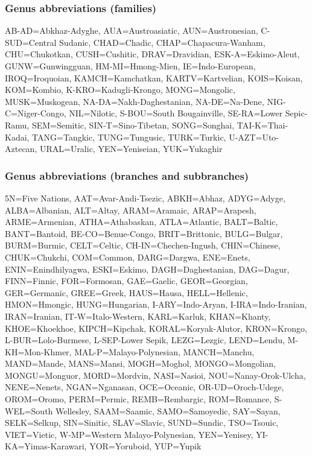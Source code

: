 
\subsubsection{Genus abbreviations (families)}
\begin{flushleft}
AB-AD=Abkhaz-Adyghe, AUA=Austroasiatic, AUN=Austronesian, C-SUD=Central Sudanic, CHAD=Chadic, CHAP=Chapacura-Wanham, CHU=Chukotkan, CUSH=Cushitic, DRAV=Dravidian, ESK-A=Eskimo-Aleut, GUNW=Gunwingguan, HM-MI=Hmong-Mien, IE=Indo-European, IROQ=Iroquoian, KAMCH=Kamchatkan, KARTV=Kartvelian, KOIS=Koisan, KOM=Kombio, K-KRO=Kadugli-Krongo, MONG=Mongolic, MUSK=Muskogean, NA-DA=Nakh-Daghestanian, NA-DE=Na-Dene, NIG-C=Niger-Congo, NIL=Nilotic, S-BOU=South Bougainville, SE-RA=Lower Sepic-Ramu, SEM=Semitic, SIN-T=Sino-Tibetan, SONG=Songhai, TAI-K=Thai-Kadai, TANG=Tangkic, TUNG=Tungusic, TURK=Turkic, U-AZT=Uto-Aztecan, URAL=Uralic, YEN=Yeniseian, YUK=Yukaghir
\end{flushleft}

\subsubsection{Genus abbreviations (branches and subbranches)}
\begin{flushleft}
5N=Five Nations, AAT=Avar-Andi-Tsezic, ABKH=Abhaz, ADYG=Adyge, ALBA=Albanian, ALT=Altay, ARAM=Aramaic, ARAP=Arapesh, ARME=Armenian, ATHA=Athabaskan, ATLA=Atlantic, BALT=Baltic, BANT=Bantoid, BE-CO=Benue-Congo, BRIT=Brittonic, BULG=Bulgar, BURM=Burmic, CELT=Celtic, CH-IN=Chechen-Ingush, CHIN=Chinese, CHUK=Chukchi, COM=Common, DARG=Dargwa, ENE=Enets, ENIN=Enindhilyagwa, ESKI=Eskimo, DAGH=Daghestanian, DAG=Dagur, FINN=Finnic, FOR=Formosan, GAE=Gaelic, GEOR=Georgian, GER=Germanic, GREE=Greek, HAUS=Hausa, HELL=Hellenic, HMON=Hmongic, HUNG=Hungarian, I-ARY=Indo-Aryan, I-IRA=Indo-Iranian, IRAN=Iranian, IT-W=Italo-Western, KARL=Karluk, KHAN=Khanty, KHOE=Khoekhoe, KIPCH=Kipchak, KORAL=Koryak-Alutor, KRON=Krongo, L-BUR=Lolo-Burmese, L-SEP-Lower Sepik, LEZG=Lezgic, LEND=Lendu, M-KH=Mon-Khmer, MAL-P=Malayo-Polynesian, MANCH=Manchu, MAND=Mande, MANS=Mansi, MOGH=Moghol, MONGO=Mongolian, MONGU=Monguor, MORD=Mordvin, NASI=Nasioi, NOU=Nanay-Orok-Ulcha, NENE=Nenets, NGAN=Nganasan, OCE=Oceanic, OR-UD=Oroch-Udege, OROM=Oromo, PERM=Permic,  REMB=Rembargic, ROM=Romance, S-WEL=South Wellesley, SAAM=Saamic, SAMO=Samoyedic, SAY=Sayan, SELK=Selkup, SIN=Sinitic, SLAV=Slavic, SUND=Sundic, TSO=Tsouic, VIET=Vietic, W-MP=Western Malayo-Polynesian, YEN=Yenisey, YI-KA=Yimas-Karawari, YOR=Yoruboid, YUP=Yupik
\end{flushleft}

